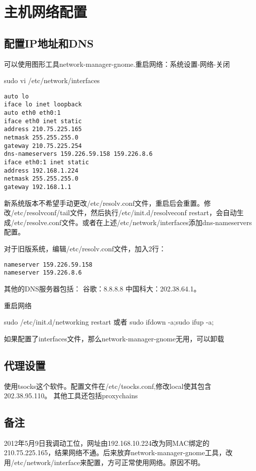 \section{主机网络配置}
\subsection{配置IP地址和DNS}
可以使用图形工具network-manager-gnome.重启网络：系统设置-网络-关闭
\begin{shellcmd}
sudo vi /etc/network/interfaces 
\end{shellcmd}
\begin{verbatim}
auto lo
iface lo inet loopback
auto eth0 eth0:1
iface eth0 inet static
address 210.75.225.165
netmask 255.255.255.0
gateway 210.75.225.254
dns-nameservers 159.226.59.158 159.226.8.6
iface eth0:1 inet static
address 192.168.1.224
netmask 255.255.255.0
gateway 192.168.1.1
\end{verbatim}

新系统版本不希望手动更改/etc/resolv.conf文件，重启后会重置。修改/etc/resolvconf/tail文件，然后执行/etc/init.d/resolveconf restart，会自动生成/etc/resolve.conf文件。或者在上述/etc/network/interfaces添加dns-nameservers配置。

对于旧版系统，编辑/etc/resolv.conf文件，加入2行： 
\begin{verbatim}
nameserver 159.226.59.158
nameserver 159.226.8.6
\end{verbatim}
其他的DNS服务器包括：
谷歌：8.8.8.8
中国科大：202.38.64.1。


重启网络
\begin{shellcmd}
sudo /etc/init.d/networking restart
或者 sudo ifdown -a;sudo ifup -a;
\end{shellcmd}
如果配置了interfaces文件，那么network-manager-gnome无用，可以卸载

\subsection{代理设置}
使用tsocks这个软件。配置文件在/etc/tsocks.conf,修改local使其包含202.38.95.110。
其他工具还包括proxychains

\subsection{备注}
2012年5月9日我调动工位，网址由192.168.10.224改为同MAC绑定的210.75.225.165，结果网络不通。后来放弃network-manager-gnome工具，改用/etc/network/interface来配置，方可正常使用网络。原因不明。





